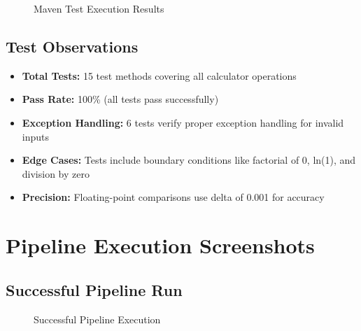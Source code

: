 \documentclass[12pt,a4paper]{article}
\begin{document}
\begin{figure}[H]
    \centering
    \caption{Maven Test Execution Results}
    \label{fig:test-results}
\end{figure}

\subsection{Test Observations}

\begin{itemize}
    \item \textbf{Total Tests:} 15 test methods covering all calculator operations
    \item \textbf{Pass Rate:} 100\% (all tests pass successfully)
    \item \textbf{Exception Handling:} 6 tests verify proper exception handling for invalid inputs
    \item \textbf{Edge Cases:} Tests include boundary conditions like factorial of 0, ln(1), and division by zero
    \item \textbf{Precision:} Floating-point comparisons use delta of 0.001 for accuracy
\end{itemize}

\section{Pipeline Execution Screenshots}

\subsection{Successful Pipeline Run}

\begin{figure}[H]
    \centering
    \caption{Successful Pipeline Execution}
    \label{fig:success-pipeline}
\end{figure}
\end{document}
